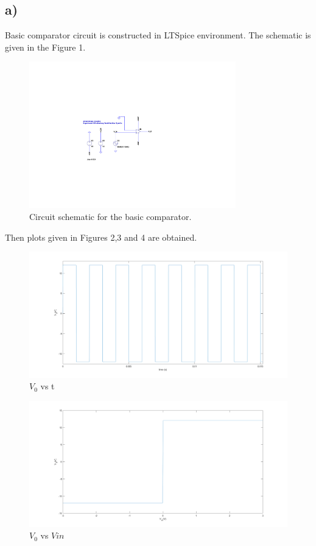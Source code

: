 \documentclass[letterpaper,12pt]{article}
\begin{document}
\subsection{a)}
Basic comparator circuit is constructed in LTSpice environment. The schematic is given in the Figure 1.
\begin{figure}[H]
	\centering
   \includegraphics[width=0.8\textwidth]{BasicComparator_SCH.pdf}
   \caption{Circuit schematic for the basic comparator.}
\end{figure} 
Then plots given in Figures 2,3 and 4 are obtained.
\begin{figure}[H]
	\centering
   \includegraphics[width=1\textwidth]{3a_vs_t.png}
   \caption{\(V_0\) vs t}
\end{figure}

\begin{figure}[H]
	\centering
   \includegraphics[width=1\textwidth]{3a_vs_vin.png}
   \caption{\(V_0\) vs \(V{in}\)}
\end{figure}
\end{document}
